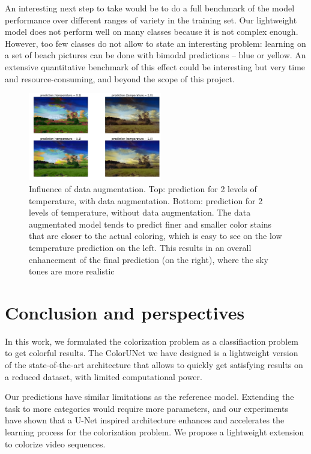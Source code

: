 \documentclass[10pt,twocolumn,letterpaper]{article}
\begin{document}
An interesting next step to take would be to do a full benchmark of the model performance over different ranges of variety in the training set. Our lightweight model does not perform well on many classes because it is not complex enough. However, too few classes do not allow to state an interesting problem: \eg learning on a set of beach pictures can be done with bimodal predictions -- blue or yellow. An extensive quantitative benchmark of this effect could be interesting but very time and resource-consuming, and beyond the scope of this project.
\begin{figure}
\begin{center}
\includegraphics[width=220px]{da_comp}
\caption{Influence of data augmentation. Top: prediction for 2 levels of temperature, with data augmentation. Bottom:  prediction for 2 levels of temperature, without data augmentation. The data augmentated model tends to predict finer and smaller color stains that are closer to the actual coloring, which is easy to see on the low temperature prediction on the left. This results in an overall enhancement of the final prediction (on the right), where the sky tones are more realistic}
\label{dacomp}
\end{center}
\end{figure}
\section{Conclusion and perspectives}

In this work, we formulated the colorization problem as a classifiaction problem to get colorful results. The ColorUNet we have designed is a lightweight version of the state-of-the-art architecture that allows to quickly get satisfying results on a reduced dataset, with limited computational power.

Our predictions have similar limitations as the reference model. Extending the task to more categories would require more parameters, and our experiments have shown that a U-Net inspired architecture enhances and accelerates the learning process for the colorization problem. We propose a lightweight extension to colorize video sequences.
\end{document}

